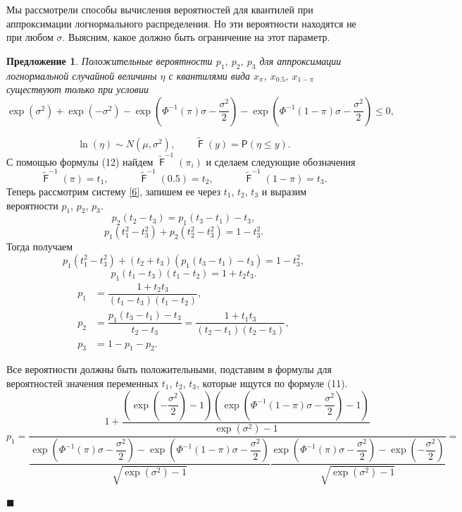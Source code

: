 \documentclass[12pt]{article}
\newtheorem{proposition}[theorem]{Предложение}
\newenvironment{Proof}{\par\noindent{\bf Доказательство.}}{\hfill$\scriptstyle\blacksquare$}
\DeclareMathOperator{\F}{\mathsf{F}}
\begin{document}
	Мы рассмотрели способы вычисления вероятностей для квантилей при аппроксимации логнормального распределения. Но эти вероятности находятся не при любом $\sigma$. Выясним, какое должно быть ограничение на этот параметр.
	\begin{proposition}
		Положительные вероятности $p_{1}$, $p_{2}$, $p_{3}$ для аппроксимации логнормальной случайной величины $\eta$ с квантилями вида $x_{\pi}$, $x_{0.5}$, $x_{1-\pi}$ существуют только при условии \[\exp(\sigma^{2})+\exp(-\sigma^{2})-\exp\left( \Phi^{-1}(\pi)\sigma-\dfrac{\sigma^{2}}{2}\right) -\exp\left( \Phi^{-1}(1-\pi)\sigma-\dfrac{\sigma^{2}}{2}\right) \leq 0,\]
	\end{proposition}
	\begin{Proof}
		\begin{equation*}
			\ln(\eta) \sim N(\mu, \sigma^{2}), \quad\quad \tilde{\F}(y) = \mathsf{P}\left(\eta\leq y \right).
		\end{equation*}
		С помощью формулы (12) найдем $\displaystyle{\tilde{\F}^{-1}(\pi_{i})}$ и сделаем следующие обозначения
		\[\tilde{\F}^{-1}(\pi) = t_{1}, \quad\quad\quad \tilde{\F}^{-1}(0.5) = t_{2}, \quad\quad\quad \tilde{\F}^{-1}(1-\pi) = t_{3}.\]
		Теперь рассмотрим систему \eqref{6}, запишем ее через $t_{1}$, $t_{2}$, $t_{3}$ и выразим вероятности $p_{1}$, $p_{2}$, $p_{3}$.
		\[p_{2}(t_{2}-t_{3})=p_{1}(t_{3}-t_{1})-t_{3},\]
		\[p_{1}(t_{1}^{2}-t_{3}^{2}) + p_{2}(t_{2}^{2} - t_{3}^{2})=1-t_{3}^{2}.\]
		Тогда получаем
		\[p_{1}(t_{1}^{2}-t_{3}^{2}) + (t_{2}+t_{3})(p_{1}(t_{3}-t_{1})-t_{3})=1-t_{3}^{2},\]
		\[p_{1}(t_{1}-t_{3})(t_{1}-t_{2})=1+t_{2}t_{3}.\]
		\begin{align}
			p_{1} &= \dfrac{1+t_{2}t_{3}}{(t_{1}-t_{3})(t_{1}-t_{2})}, \label{15}\\
			p_{2} &= \dfrac{p_{1}(t_{3}-t_{1})-t_{3}}{t_{2}-t_{3}}=\dfrac{1+t_{1}t_{3}}{(t_{2}-t_{1})(t_{2}-t_{3})}, \label{16}\\
			p_{3} &= 1-p_{1}-p_{2}. \label{17}
		\end{align}
		
		Все вероятности должны быть положительными, подставим в формулы для вероятностей значения переменных $t_{1}$, $t_{2}$, $t_{3}$, которые ищутся по формуле (11).
		\[p_{1}=\dfrac{1+\dfrac{\left( \exp\left( -\dfrac{\sigma^{2}}{2}\right) -1\right) \left( \exp(\Phi^{-1}(1-\pi)\sigma-\dfrac{\sigma^{2}}{2})-1\right) }{\exp(\sigma^{2})-1}}{\dfrac{\exp\left( \Phi^{-1}(\pi)\sigma-\dfrac{\sigma^{2}}{2}\right) -\exp\left( \Phi^{-1}(1-\pi)\sigma-\dfrac{\sigma^{2}}{2}\right) }{\sqrt{\exp(\sigma^{2})-1}}\dfrac{\exp\left( \Phi^{-1}(\pi)\sigma-\dfrac{\sigma^{2}}{2}\right) -\exp\left( -\dfrac{\sigma^{2}}{2}\right) }{\sqrt{\exp(\sigma^{2})-1}}}=\]
		

\end{Proof}
\end{document}
